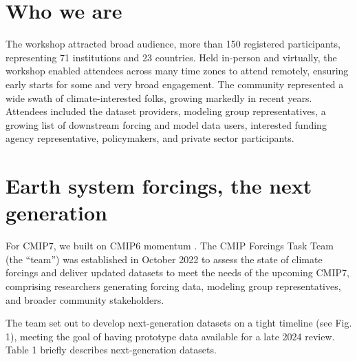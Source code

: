 \documentclass{ametsocV6.1}
\begin{document}
\section*{Who we are}
The workshop attracted broad audience, more than 150 registered participants, representing 71 institutions and 23 countries. Held in-person and virtually, the workshop enabled attendees across many time zones to attend remotely, ensuring early starts for some and very broad engagement. The community represented a wide swath of climate-interested folks, growing markedly in recent years. Attendees included the dataset providers, modeling group representatives, a growing list of downstream forcing and model data users, interested funding agency representative, policymakers, and private sector participants.

\section*{Earth system forcings, the next generation}
For CMIP7, we built on CMIP6 momentum \citep{durack_toward_2018}. The CMIP Forcings Task Team (the ``team'') was established in October 2022 to assess the state of climate forcings and deliver updated datasets to meet the needs of the upcoming CMIP7, comprising researchers generating forcing data, modeling group representatives, and broader community stakeholders.

The team set out to develop next-generation datasets on a tight timeline (see Fig. 1), meeting the goal of having prototype data available for a late 2024 review. Table 1 briefly describes next-generation datasets.
\end{document}
